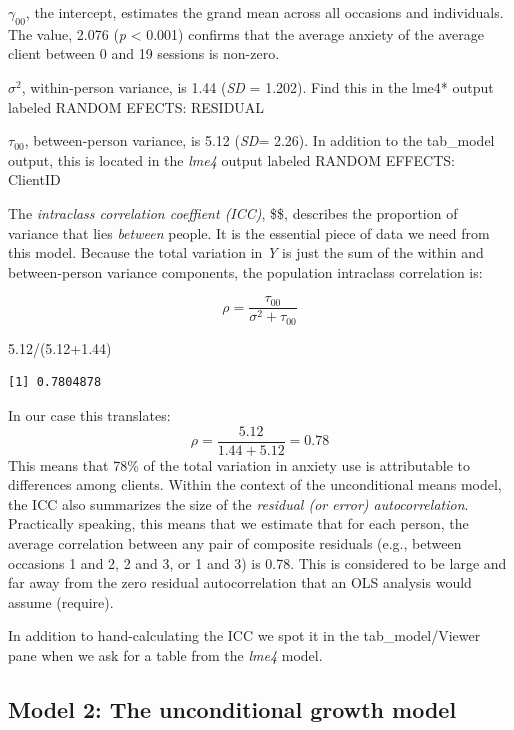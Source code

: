 \documentclass[
  11pt,
]{book}
\newenvironment{Shaded}{\begin{snugshade}}{\end{snugshade}}
\newcommand{\FloatTok}[1]{\textcolor[rgb]{0.00,0.00,0.81}{#1}}
\newcommand{\NormalTok}[1]{#1}
\newcommand{\SpecialCharTok}[1]{\textcolor[rgb]{0.00,0.00,0.00}{#1}}
\begin{document}
\(\gamma_{00}\), the intercept, estimates the grand mean across all occasions and individuals. The value, 2.076 (\emph{p} \textless{} 0.001) confirms that the average anxiety of the average client between 0 and 19 sessions is non-zero.

\(\sigma^{2}\), within-person variance, is 1.44 (\emph{SD} = 1.202). Find this in the lme4* output labeled RANDOM EFECTS: RESIDUAL

\(\tau_{00}\), between-person variance, is 5.12 (\emph{SD}= 2.26). In addition to the tab\_model output, this is located in the \emph{lme4} output labeled RANDOM EFFECTS: ClientID

The \emph{intraclass correlation coeffient (ICC)}, \$\rho \$, describes the proportion of variance that lies \emph{between} people. It is the essential piece of data we need from this model. Because the total variation in \emph{Y} is just the sum of the within and between-person variance components, the population intraclass correlation is:

\[\rho =\frac{\tau_{00}}{\sigma^{2}+\tau_{00}}\]

\begin{Shaded}
\begin{Highlighting}[]
\FloatTok{5.12}\SpecialCharTok{/}\NormalTok{(}\FloatTok{5.12+1.44}\NormalTok{)}
\end{Highlighting}
\end{Shaded}

\begin{verbatim}
[1] 0.7804878
\end{verbatim}

In our case this translates:\\
\[\rho =\frac{5.12}{1.44 + 5.12} = 0.78\]
This means that 78\% of the total variation in anxiety use is attributable to differences among clients. Within the context of the unconditional means model, the ICC also summarizes the size of the \emph{residual (or error) autocorrelation}. Practically speaking, this means that we estimate that for each person, the average correlation between any pair of composite residuals (e.g., between occasions 1 and 2, 2 and 3, or 1 and 3) is 0.78. This is considered to be large and far away from the zero residual autocorrelation that an OLS analysis would assume (require).

In addition to hand-calculating the ICC we spot it in the tab\_model/Viewer pane when we ask for a table from the \emph{lme4} model.

\hypertarget{model-2-the-unconditional-growth-model}{%
\subsection{Model 2: The unconditional growth model}\label{model-2-the-unconditional-growth-model}}
\end{document}
